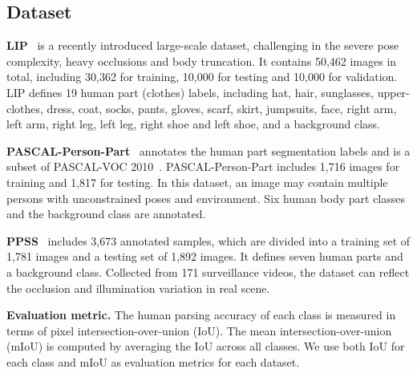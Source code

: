 \documentclass[runningheads]{llncs}
\begin{document}
\subsection{Dataset}
\textbf{LIP}~\cite{gong2017look} is a recently introduced large-scale dataset, challenging in the severe pose complexity, heavy occlusions and body truncation. It contains 50,462 images in total, including 30,362 for training, 10,000 for testing and 10,000 for validation. LIP defines 19 human part (clothes) labels, including hat, hair, sunglasses, upper-clothes, dress, coat, socks, pants, gloves, scarf, skirt, jumpsuits, face, right arm, left arm, right leg, left leg, right shoe and left shoe, and  a background class.

\textbf{PASCAL-Person-Part}~\cite{chen2014detect} annotates the human part segmentation labels and is a subset of PASCAL-VOC 2010~\cite{pascal-voc-2010}. PASCAL-Person-Part includes 1,716 images for training and 1,817 for testing. In this dataset, an image may contain  multiple persons with unconstrained poses and environment. Six human body part classes and the background class are annotated.

\textbf{PPSS}~\cite{luo2013pedestrian} includes 3,673 annotated samples, which are divided into a training set of 1,781 images and a testing set of 1,892 images. It defines seven human parts and a background class. Collected from 171 surveillance videos, the dataset can reflect the occlusion and illumination variation in real scene.

\textbf{Evaluation metric.}
The human parsing accuracy of each class is measured in terms of pixel intersection-over-union (IoU). The mean intersection-over-union (mIoU) is computed by averaging the IoU across all classes. We use both IoU for each class and mIoU as evaluation metrics for each dataset.
\end{document}
